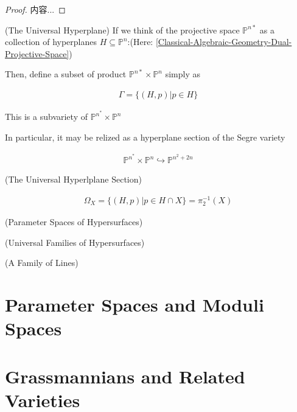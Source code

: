\documentclass[Total.tex]{subfiles}
\begin{document}
		\begin{proof}
			内容...
		\end{proof}
		
		\begin{example}
			(The Universal Hyperplane) If we think of the projective space $\mathbb{P}^{n*}$ as a collection of hyperplanes $H\subseteq \mathbb{P}^n$:(Here: \ref{Classical-Algebraic-Geometry-Dual-Projective-Space})
			
			Then, define a subset of product $\mathbb{P}^{n*}\times\mathbb{P}^n$ simply as
			
			\begin{gather*}
				\Gamma=\{(H,p)|p\in H\}
			\end{gather*}
			
			This is a subvariety of $\mathbb{P}^{n^*}\times \mathbb{P}^n$
		\end{example}
		
		In particular, it may be relized as a hyperplane section of the Segre variety
		
		\begin{gather*}
			\mathbb{P}^{n^*}\times \mathbb{P}^n \hookrightarrow \mathbb{P}^{n^2+2n}
		\end{gather*}
		
		\begin{example}
			(The Universal Hyperlplane Section)
			
			\begin{gather*}
				\Omega_X=\{(H,p)|p\in H\cap X\}=\pi_2^{-1}(X)
			\end{gather*}
		\end{example}
		
		\begin{example}
			(Parameter Spaces of Hypersurfaces)
		\end{example}
		
		\begin{example}
			(Universal Families of Hypersurfaces)
		\end{example}
		
		\begin{example}
			(A Family of Lines)
		\end{example}
		
		
		\section{Parameter Spaces and Moduli Spaces}
		
		\section{Grassmannians and Related Varieties}
		
\end{document}
